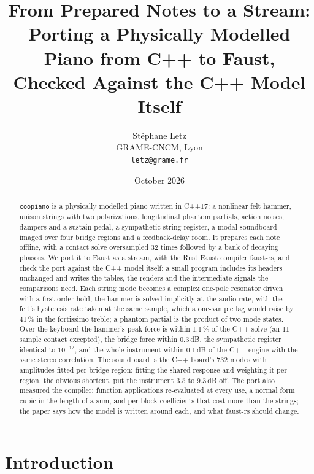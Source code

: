 \documentclass[10pt,a4paper,twocolumn]{article}
\title{From Prepared Notes to a Stream:\\Porting a Physically Modelled Piano from C++ to Faust,\\Checked Against the C++ Model Itself}
\author{St\'ephane Letz\\GRAME-CNCM, Lyon\\\texttt{letz@grame.fr}}
\date{October 2026}
\newcommand{\faustrs}{faust-rs}
\newcommand{\coop}{\texttt{coopiano}}
\begin{document}
\maketitle

\begin{abstract}
\coop{} is a physically modelled piano written in C++17: a nonlinear felt hammer, unison strings with two polarizations, longitudinal phantom partials, action noises, dampers and a sustain pedal, a sympathetic string register, a modal soundboard imaged over four bridge regions and a feedback-delay room. It prepares each note offline, with a contact solve oversampled 32 times followed by a bank of decaying phasors. We port it to Faust as a stream, with the Rust Faust compiler \faustrs{}, and check the port against the C++ model itself: a small program includes its headers unchanged and writes the tables, the renders and the intermediate signals the comparisons need. Each string mode becomes a complex one-pole resonator driven with a first-order hold; the hammer is solved implicitly at the audio rate, with the felt's hysteresis rate taken at the same sample, which a one-sample lag would raise by 41\,\% in the fortissimo treble; a phantom partial is the product of two mode states. Over the keyboard the hammer's peak force is within 1.1\,\% of the C++ solve (an 11-sample contact excepted), the bridge force within 0.3\,dB, the sympathetic register identical to $10^{-12}$, and the whole instrument within 0.1\,dB of the C++ engine with the same stereo correlation. The soundboard is the C++ board's 732 modes with amplitudes fitted per bridge region: fitting the shared response and weighting it per region, the obvious shortcut, put the instrument 3.5 to 9.3\,dB off. The port also measured the compiler: function applications re-evaluated at every use, a normal form cubic in the length of a sum, and per-block coefficients that cost more than the strings; the paper says how the model is written around each, and what \faustrs{} should change.
\end{abstract}

\section{Introduction}
\end{document}
